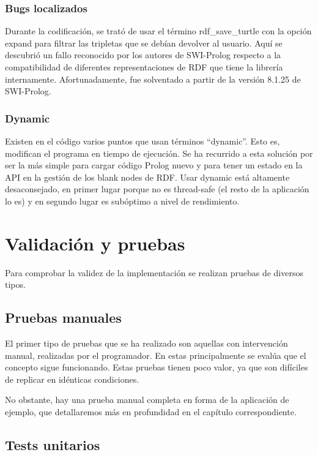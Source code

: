 \documentclass[openright,twoside,12pt]{book}
\begin{document}
\subsection{Bugs localizados}

Durante la codificación, se trató de usar el término rdf\_save\_turtle con la opción expand para filtrar las tripletas que se debían devolver al usuario. Aquí se descubrió un fallo reconocido por los autores de SWI-Prolog respecto a la compatibilidad de diferentes representaciones de RDF que tiene la librería internamente. Afortunadamente, fue solventado a partir de la versión 8.1.25 de SWI-Prolog\cite{bug}.

\subsection{Dynamic}

Existen en el código varios puntos que usan términos ``dynamic''. Esto es, modifican el programa en tiempo de ejecución. Se ha recurrido a esta solución por ser la más simple para cargar código Prolog nuevo y para tener un estado en la API en la gestión de los blank nodes de RDF. Usar dynamic está altamente desaconsejado, en primer lugar porque no es thread-safe (el resto de la aplicación lo es) y en segundo lugar es subóptimo a nivel de rendimiento.


\chapter{Validación y pruebas}

Para comprobar la validez de la implementación se realizan pruebas de diversos tipos.

\section{Pruebas manuales}

El primer tipo de pruebas que se ha realizado son aquellas con intervención manual, realizadas por el programador. En estas principalmente se evalúa que el concepto sigue funcionando. Estas pruebas tienen poco valor, ya que son difíciles de replicar en idénticas condiciones.

No obstante, hay una prueba manual completa en forma de la aplicación de ejemplo, que detallaremos más en profundidad en el capítulo correspondiente.

\section{Tests unitarios}
\end{document}
